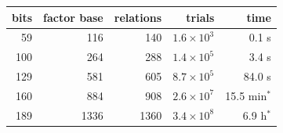 \begin{tabular}{rrrrr}
\toprule
bits & factor base & relations & trials & time \\
\midrule
59 & 116 & 140 & $1.6\times10^{3}$ & 0.1 s\\
100 & 264 & 288 & $1.4\times10^{5}$ & 3.4 s\\
129 & 581 & 605 & $8.7\times10^{5}$ & 84.0 s\\
160 & 884 & 908 & $2.6\times10^{7}$ & 15.5 min$^*$\\
189 & 1336 & 1360 & $3.4\times10^{8}$ & 6.9 h$^*$\\
\bottomrule
\end{tabular}